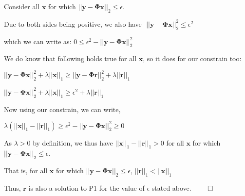 \documentclass[fleqn, 11pt]{article}
\newcommand{\bs}[1]{\boldsymbol{#1}}
\begin{document}
\medskip 

Consider all $\bs{x}$ for which $|| \bs{y}-\bs{\Phi} \bs{x} ||_2  \leq \epsilon$.

Due to both sides being positive, we also have- 
$|| \bs{y}-\bs{\Phi} \bs{x} ||_2^2  \leq \epsilon^2$

\medskip

which we can write as: 
$ 0 \leq \epsilon^2- || \bs{y}-\bs{\Phi} \bs{x} ||_2^2$

\medskip 

We do know that following holds true for all $\bs{x}$, so it does for our constrain too:

\medskip

$|| \bs{y}-\bs{\Phi} \bs{x} ||_2^2 + \lambda ||\bs{x}||_1 
\geq || \bs{y}-\bs{\Phi} \bs{r} ||_2^2 + \lambda ||\bs{r}||_1 
$


\medskip

$|| \bs{y}-\bs{\Phi} \bs{x} ||_2^2 + \lambda ||\bs{x}||_1 
\geq \epsilon^2 + \lambda ||\bs{r}||_1 
$

\medskip

Now using our constrain, we can write, 

\medskip

$  \lambda ( ||\bs{x}||_1 -   ||\bs{r}||_1  ) \geq 
\epsilon^2 - || \bs{y}-\bs{\Phi} \bs{x} ||_2^2 \geq 0
$

\medskip

As $\lambda>0$ by definition, we thus have $||\bs{x}||_1 -   ||\bs{r}||_1  > 0$ 
for all $\bs{x}$ for which $|| \bs{y}-\bs{\Phi} \bs{x} ||_2  \leq \epsilon$.

\medskip

That is, for all  $\bs{x}$ for which $|| \bs{y}-\bs{\Phi} \bs{x} ||_2  \leq \epsilon$, 
$  ||\bs{r}||_1 < ||\bs{x}||_1 $ 

\smallskip

Thus, $\bs{r}$ is also a solution to P1 for the value of $\epsilon$ stated above. 
$\qed$
\end{document}
